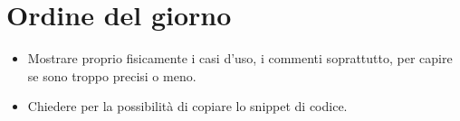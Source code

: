 

\section{Ordine del giorno}

\begin{itemize}
    \item Mostrare proprio fisicamente i casi d'uso, i commenti soprattutto, per capire se sono troppo precisi o meno. 
    \item Chiedere per la possibilità di copiare lo snippet di codice.

\end{itemize}